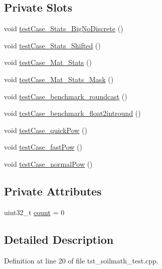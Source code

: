 \subsection*{Private Slots}
\begin{DoxyCompactItemize}
\item 
void \hyperlink{class_soil_math___test_a605821d942854308a2557763708c77f0}{test\+Case\+\_\+\+Stats\+\_\+\+Big\+No\+Discrete} ()
\item 
void \hyperlink{class_soil_math___test_a8e6337f7d3bbe1b344f8ae4e3b70ddab}{test\+Case\+\_\+\+Stats\+\_\+\+Shifted} ()
\item 
void \hyperlink{class_soil_math___test_a7d9aeafa693fad06c4d4a8c0409f5f58}{test\+Case\+\_\+\+Mat\+\_\+\+Stats} ()
\item 
void \hyperlink{class_soil_math___test_a8fc45bafb08a1480751e491645dc634a}{test\+Case\+\_\+\+Mat\+\_\+\+Stats\+\_\+\+Mask} ()
\item 
void \hyperlink{class_soil_math___test_ae31bfe07ba0acf742447f52f32f37519}{test\+Case\+\_\+benchmark\+\_\+roundcast} ()
\item 
void \hyperlink{class_soil_math___test_a409d3ab35999ef8a7b217f9e50ca0ba0}{test\+Case\+\_\+benchmark\+\_\+float2intround} ()
\item 
void \hyperlink{class_soil_math___test_aa6c80a8278e16cfdab3947c98c71e3be}{test\+Case\+\_\+quick\+Pow} ()
\item 
void \hyperlink{class_soil_math___test_ac8a7be30b5df394cdf1a784abcad4a04}{test\+Case\+\_\+fast\+Pow} ()
\item 
void \hyperlink{class_soil_math___test_aca4ac3b1b8790bd74559e880522559c4}{test\+Case\+\_\+normal\+Pow} ()
\end{DoxyCompactItemize}
\subsection*{Private Attributes}
\begin{DoxyCompactItemize}
\item 
uint32\+\_\+t \hyperlink{class_soil_math___test_a693af150765ec63434f414f36e27b91e}{count} = 0
\end{DoxyCompactItemize}


\subsection{Detailed Description}


Definition at line 20 of file tst\+\_\+soilmath\+\_\+test.\+cpp.



